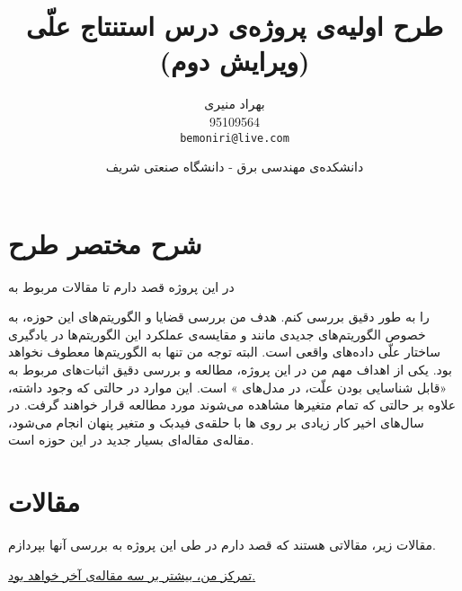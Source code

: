 \documentclass{article}
\title{
	طرح اولیه‌ی پروژه‌ی درس استنتاج علّی (ویرایش دوم)
	\\
\vspace{0.5cm}
\textbf{\lr{A Review on Additive Noise Models:\\ Theory and Learning Algorithms}}
}
\author{بهراد منیری\\95109564\\ \texttt{bemoniri@live.com}}
\date{دانشکده‌ی مهندسی برق - دانشگاه صنعتی شریف}
\begin{document}
\maketitle
\section{شرح مختصر طرح}

در این پروژه قصد دارم تا  مقالات مربوط به 

را به طور دقیق بررسی کنم. هدف من بررسی  قضایا و الگوریتم‌های این حوزه، به خصوص الگوریتم‌های جدیدی مانند  و مقایسه‌ی عملکرد این الگوریتم‌ها در یادگیری ساختار علّی داده‌های واقعی است.   البته توجه من تنها به الگوریتم‌ها معطوف نخواهد بود. یکی از اهداف مهم من در این پروژه، مطالعه و بررسی دقیق اثبات‌های مربوط به «قابل شناسایی بودن علّت، در مدل‌های
»
است. این موارد در حالتی که 
وجود داشته، علاوه بر حالتی که  تمام متغیرها مشاهده می‌شوند مورد مطالعه قرار خواهند گرفت. در سال‌های اخیر کار زیادی بر روی 
 ها با حلقه‌ی فیدبک و متغیر پنهان انجام می‌شود،  مقاله‌ی
\cite{con}
مقاله‌ای بسیار جدید در این حوزه است.


\indent
\section{مقالات}
	مقالات زیر، مقالاتی هستند که قصد دارم در طی این پروژه به بررسی آنها بپردازم.

\underline{تمرکز من، بیشتر بر سه مقاله‌ی آخر خواهد بود.}
\end{document}
